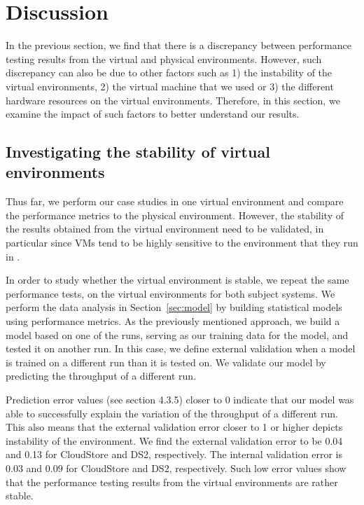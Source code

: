 \documentclass[smallextended]{svjour3}       %
\begin{document}
\section{Discussion}
\label{sec:discussion}

In the previous section, we find that there is a discrepancy between performance testing results from the virtual and physical environments. However, such discrepancy can also be due to other factors such as 1) the instability of the virtual environments, 2) the virtual machine that we used or 3) the different hardware resources on the virtual environments. Therefore, in this section, we examine the impact of such factors to better understand our results. 


\subsection{Investigating the stability of virtual environments}

Thus far, we perform our case studies in one virtual environment and compare the performance metrics to the physical environment. However, the stability of the results obtained from the virtual environment need to be validated, in particular since VMs tend to be highly sensitive to the environment that they run in \cite{leitner}.
 

In order to study whether the virtual environment is stable, we repeat the same performance tests, on the virtual environments for both subject systems. We perform the data analysis in Section~\ref{sec:model} by building statistical models using performance metrics. %
As the previously mentioned approach, we build a model based on one of the runs, serving as our training data for the model, and tested it on another run. In this case, we define external validation when a model is trained on a different run than it is tested on. We validate our model by predicting the throughput of a different run.  

Prediction error values (see section 4.3.5) closer to 0 indicate that our model was able to successfully explain the variation of the throughput of a different run. This also means that the external validation error closer to 1 or higher depicts instability of the environment. We find the external validation error to be 0.04 and 0.13 for CloudStore and DS2, respectively. The internal validation error is 0.03 and 0.09 for CloudStore and DS2, respectively. Such low error values show that the performance testing results from the virtual environments are rather stable. 
\end{document}
